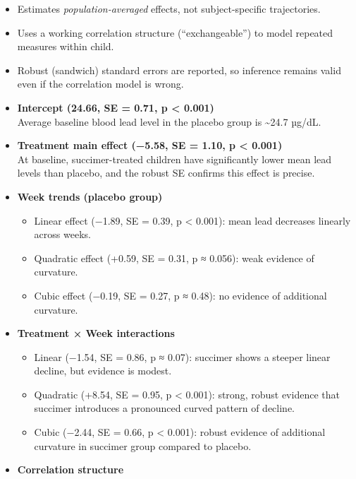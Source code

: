 \documentclass[
  letterpaper,
  DIV=11,
  numbers=noendperiod]{scrreprt}
\providecommand{\tightlist}{%
  \setlength{\itemsep}{0pt}\setlength{\parskip}{0pt}}\usepackage{longtable,booktabs,array}
\begin{document}
\begin{itemize}
\item
  Estimates \emph{population-averaged} effects, not subject-specific
  trajectories.\\
\item
  Uses a working correlation structure (``exchangeable'') to model
  repeated measures within child.\\
\item
  Robust (sandwich) standard errors are reported, so inference remains
  valid even if the correlation model is wrong.
\item
  \textbf{Intercept (24.66, SE = 0.71, p \textless{} 0.001)}\\
  Average baseline blood lead level in the placebo group is
  \textasciitilde24.7 µg/dL.
\item
  \textbf{Treatment main effect (−5.58, SE = 1.10, p \textless{}
  0.001)}\\
  At baseline, succimer-treated children have significantly lower mean
  lead levels than placebo, and the robust SE confirms this effect is
  precise.
\item
  \textbf{Week trends (placebo group)}

  \begin{itemize}
  \tightlist
  \item
    Linear effect (−1.89, SE = 0.39, p \textless{} 0.001): mean lead
    decreases linearly across weeks.\\
  \item
    Quadratic effect (+0.59, SE = 0.31, p ≈ 0.056): weak evidence of
    curvature.\\
  \item
    Cubic effect (−0.19, SE = 0.27, p ≈ 0.48): no evidence of additional
    curvature.
  \end{itemize}
\item
  \textbf{Treatment × Week interactions}

  \begin{itemize}
  \tightlist
  \item
    Linear (−1.54, SE = 0.86, p ≈ 0.07): succimer shows a steeper linear
    decline, but evidence is modest.\\
  \item
    Quadratic (+8.54, SE = 0.95, p \textless{} 0.001): strong, robust
    evidence that succimer introduces a pronounced curved pattern of
    decline.\\
  \item
    Cubic (−2.44, SE = 0.66, p \textless{} 0.001): robust evidence of
    additional curvature in succimer group compared to placebo.
  \end{itemize}
\item
  \textbf{Correlation structure}


\end{itemize}
\end{document}
